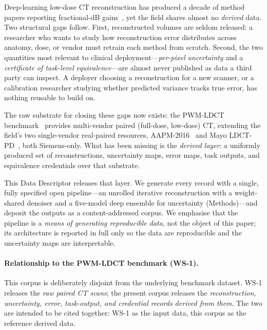 \documentclass{article}
\begin{document}
Deep-learning low-dose CT reconstruction has produced a decade of method
papers reporting fractional-dB gains~\citep{chen2017redcnn,wang2020deeplearningreview,song2022scorebased},
yet the field shares almost no \emph{derived} data. Two structural gaps
follow. First, reconstructed volumes are seldom released: a researcher
who wants to study how reconstruction error distributes across anatomy,
dose, or vendor must retrain each method from scratch. Second, the two
quantities most relevant to clinical deployment---\emph{per-pixel
uncertainty} and a \emph{certificate of task-level equivalence}---are
almost never published as data a third party can inspect. A deployer
choosing a reconstruction for a new scanner, or a calibration researcher
studying whether predicted variance tracks true error, has nothing
reusable to build on.

The raw substrate for closing these gaps now exists: the PWM-LDCT
benchmark~\citep{ws1dataset} provides multi-vendor paired (full-dose,
low-dose) CT, extending the field's two single-vendor real-paired
resources, AAPM-2016~\citep{aapm2016challenge} and Mayo
LDCT-PD~\citep{mccollough2020mayo}, both Siemens-only. What has been
missing is the \emph{derived layer}: a uniformly produced set of
reconstructions, uncertainty maps, error maps, task outputs, and
equivalence credentials over that substrate.

This Data Descriptor releases that layer. We generate every record with a
single, fully specified open pipeline---an unrolled iterative
reconstruction with a weight-shared denoiser and a five-model deep
ensemble for uncertainty (Methods)---and deposit the outputs as a
content-addressed corpus. We emphasise that the pipeline is a
\emph{means of generating reproducible data}, not the object of this
paper; its architecture is reported in full only so the data are
reproducible and the uncertainty maps are interpretable.

\paragraph{Relationship to the PWM-LDCT benchmark (WS-1).} This corpus is
deliberately disjoint from the underlying benchmark dataset. WS-1
releases the \emph{raw paired CT scans}; the present corpus releases the
\emph{reconstruction, uncertainty, error, task-output, and credential
records derived from them}. The two are intended to be cited together:
WS-1 as the input data, this corpus as the reference derived data.
\end{document}
